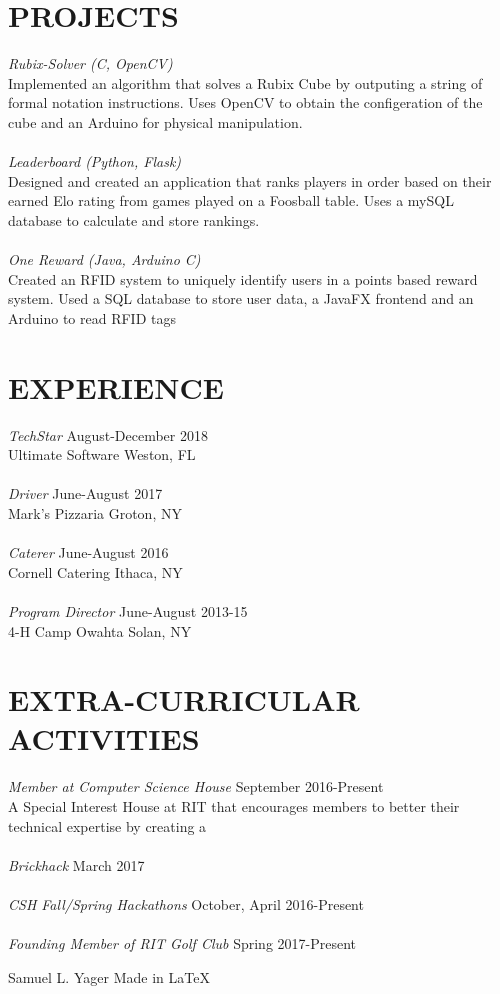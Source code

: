 \documentclass[margin]{res}
\begin{document}
\begin{resume}
\section{PROJECTS} {\sl Rubix-Solver (C, OpenCV)}\\
			Implemented an algorithm that solves a Rubix Cube
			by outputing a string of formal notation instructions.
			Uses OpenCV to obtain the configeration of the cube and an Arduino for physical manipulation.\\\\
		{\sl Leaderboard (Python, Flask)}\\
			Designed and created an application that ranks players in order based
			on their earned Elo rating from games played on a
			Foosball table. Uses a mySQL database to calculate and store rankings.\\\\ 
		{\sl One Reward (Java, Arduino C)}\\
			Created an RFID system to uniquely identify users in a points based 
            reward system. Used a SQL database to store user data, a JavaFX
            frontend and an Arduino to read RFID tags

\section{EXPERIENCE} {\sl TechStar} \hfill August-December 2018\\
            Ultimate Software Weston, FL\\\\
			{\sl Driver} \hfill June-August 2017\\
			Mark's Pizzaria Groton, NY\\\\
			{\sl Caterer} \hfill June-August 2016\\
			Cornell Catering Ithaca, NY\\\\
            {\sl Program Director} \hfill June-August 2013-15\\
			4-H Camp Owahta Solan, NY

\section{EXTRA-CURRICULAR \\ ACTIVITIES}             
        	{\sl Member at Computer Science House} \hfill 	September 2016-Present\\
		A Special Interest House at RIT that encourages members to 
		better their technical expertise by creating a \\\\ 
		{\sl Brickhack}  \hfill 				March 2017\\\\
		{\sl CSH Fall/Spring Hackathons} \hfill 		October, April 2016-Present\\\\
		{\sl Founding Member of RIT Golf Club} \hfill 		Spring 2017-Present

\end{resume}

\scriptsize{Samuel L. Yager} \hfill 
\scriptsize{Made in \LaTeX}
\end{document}
